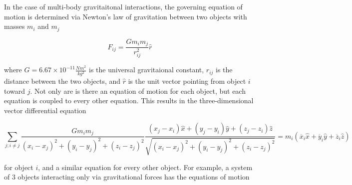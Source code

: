 \documentclass{report}
\begin{document}
            In the case of multi-body gravitaitonal interactions, the governing equation of motion is determined via Newton's law of gravitation between two objects with masses $m_i$ and $m_j$

            \begin{equation}
                F_{ij} = \frac{G m_i m_j}{r_{ij}^2} \hat{r}
            \end{equation}

            where $G = 6.67 \times 10^{-11} \frac{N m^2}{kg^2}$ is the universal gravitaional constant, $r_{ij}$ is the distance between the two objects, and $\hat{r}$ is the unit vector pointing from object $i$ toward $j$.  Not only are is there an equation of motion for each object, but each equation is coupled to every other equation.  This results in the three-dimensional vector differential equation\cite{taylor2005classical}

            \begin{equation}
                \sum_{j; i \neq j} \frac{G m_i m_j}{(x_i - x_j)^2 + (y_i - y_j)^2 + (z_i - z_j)^2} \frac{(x_j - x_i) \hat{x} + (y_j - y_i) \hat{y} + (z_j - z_i) \hat{z}}{\sqrt{(x_i - x_j)^2 + (y_i - y_j)^2 + (z_i - z_j)^2}} = m_i (\ddot{x_i} \hat{x} + \ddot{y_i} \hat{y} + \ddot{z_i} \hat{z})
            \end{equation}

            for object $i$, and a similar equation for every other object.  For example, a system of 3 objects interacting only via gravitational forces has the equations of motion 
\end{document}
